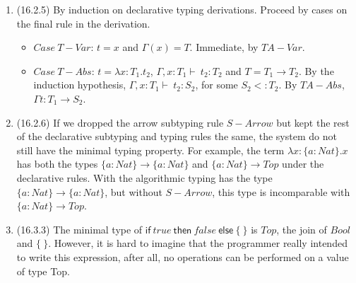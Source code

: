 \documentclass{article}
\begin{document}
\begin{enumerate}

\item (16.2.5) By induction on declarative typing derivations. Proceed by cases on the final rule in the derivation.
\begin{itemize}
\item $Case \ T-Var$: $t = x$ and $\Gamma(x) = T$. Immediate, by $TA-Var$.
\item $Case \ T-Abs$: $t = \lambda x:T_1.t_2$, $\Gamma, x:T_1 \vdash \ t_2 : T_2$ and $T = T_1 \to T_2$. By the induction hypothesis, $\Gamma, x:T_1 \vdash \ t_2 : S_2$, for some $S_2 <: T_2$. By $TA-Abs$, $\Gamma  t : T_1 \to S_2$.
\end{itemize}

\begin{comment}
 By S-Arrow, T1!S2 <: T1!T2, as required.
Case T-App: t = t1 t2 ?? t1 : T11!T12 ?? ` t2 : T11 T = T12
By the induction hypothesis, ?? `? t1 : S1 for some S1 <: T11!T12 and ?? `?
t2 : S2 for some S2 <: T11. By the inversion lemma for the subtype relation
(15.3.2), S1 must have the form S11!S12, for some S11 and S12 with T11 <: S11
and S12 <: T12. By transitivity, S2 <: S11. By the completeness of algorithmic
subtyping, `? S2 <: S11. Now, by TA-App, ?? `? t1 t2 : S12, which finishes this
case (since we already have S12 <: T12).
Case T-Rcd: t = {li=ti
i21..n} ?? ` ti : Ti for each i
T = {li:Ti
i21..n}
Straightforward.
Case T-Proj: t = t1.lj ?? ` t1 : {li:Ti
i21..n} T = Tj
Similar to the application case.
Case T-Sub: t : S S <: T
By the induction hypothesis and transitivity of subtyping.
\end{comment}
\item (16.2.6) If we dropped the arrow subtyping rule $S-Arrow$ but kept the rest of the declarative subtyping and typing rules the same, the system do not still have the minimal typing property. For example, the term $\lambda x:\{a:Nat\}.x$ has both the types $\{a:Nat\} \to \{a:Nat\}$ and $\{a:Nat\} \to Top$ under the declarative rules. With the algorithmic typing has the type $\{a:Nat\} \to \{a:Nat\}$,  but without $S-Arrow$, this type is incomparable with $\{a:Nat\} \to Top$.
\item (16.3.3) The minimal type of $ \mathsf{if} \ true \ \mathsf {then} \ false \ \mathsf {else} \  \{ \ \}$ is $Top$, the join of $Bool$ and $\{ \ \}$. However, it is hard to imagine that the programmer really intended to write this expression, after all, no operations can be performed on a value of type Top.
\end{enumerate}
\end{document}
